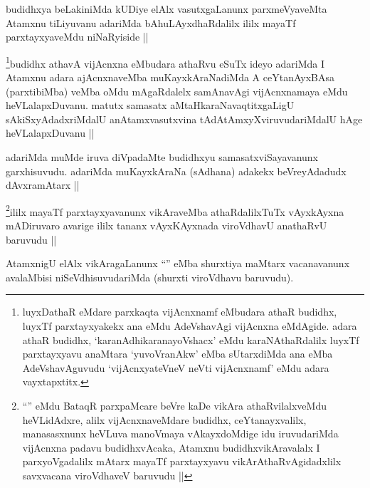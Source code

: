 \begin{artha}
budidhxya beLakiniMda kUDiye elAlx vasutxgaLanunx parxmeVyaveMta Atamxnu tiLiyuvanu adariMda bAhuLAyxdhaRdalilx ililx mayaTf parxtayxyaveMdu niNaRyiside ||
\end{artha}

\begin{artha}
\footnote{luyxDathaR eMdare parxkaqta vijAcnxnamf eMbudara athaR budidhx, luyxTf parxtayxyakekx ana eMdu AdeVshavAgi vijAcnxna eMdAgide. adara athaR budidhx, `karanAdhikaranayoVshacx' eMdu karaNAthaRdalilx luyxTf parxtayxyavu anaMtara `yuvoVranAkw' eMba sUtarxdiMda ana eMba AdeVshavAguvudu `vijAcnxyateV\s neV neVti vijAcnxnamf' eMdu adara vayxtapxtitx.}budidhx athavA vijAcnxna eMbudara athaRvu eSuTx ideyo adariMda I Atamxnu adara ajAcnxnaveMba muKayxkAraNadiMda A ceYtanAyxBAsa (parxtibiMba) veMba oMdu mAgaRdalelx samAnavAgi vijAcnxnamaya eMdu heVLalapxDuvanu. matutx samasatx aMtaHkaraNavaqtitxgaLigU sAkiSxyAdadxriMdalU anAtamxvasutxvina tAdAtAmxyXviruvudariMdalU hAge heVLalapxDuvanu ||
\end{artha}

\begin{artha}
adariMda muMde iruva diVpadaMte budidhxyu samasatxviSayavanunx garxhisuvudu. adariMda muKayxkAraNa (sAdhana) adakekx beVreyAdadudx dAvxramAtarx ||
\end{artha}

\begin{artha}
\footnote{``\stext'' eMdu BataqR parxpaMcare beVre kaDe vikAra athaRvilalxveMdu heVLidAdxre, alilx vijAcnxnaveMdare budidhx, ceYtanayxvalilx, manasasxnunx heVLuva manoVmaya vAkayxdoMdige idu iruvudariMda vijAcnxna padavu budidhxvAcaka, Atamxnu budidhxvikAravalalx I parxyoVgadalilx mAtarx mayaTf parxtayxyavu vikArAthaRvAgidadxlilx savxvacana viroVdhaveV baruvudu ||}ililx mayaTf parxtayxyavanunx vikAraveMba athaRdalilxTuTx vAyxkAyxna mADiruvaro avarige ililx tananx vAyxKAyxnada viroVdhavU anathaRvU baruvudu ||
\end{artha}

\begin{artha}
AtamxnigU elAlx vikAragaLanunx ``\stext'' eMba shurxtiya maMtarx vacanavanunx avalaMbisi niSeVdhisuvudariMda (shurxti viroVdhavu baruvudu).
\end{artha}

